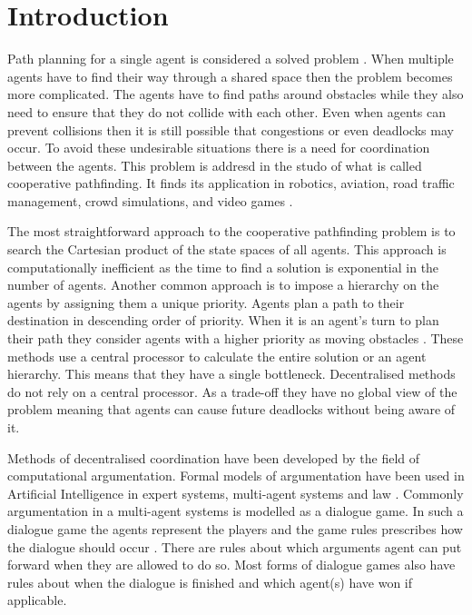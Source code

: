 \section{Introduction}\label{sec:intro}
Path planning for a single agent is considered a solved problem
\citep{sharon2013}. When multiple agents have to find their way through a
shared
space then the problem becomes more complicated. The agents have to find paths
around obstacles while they also need to ensure that they do not collide with
each other. Even when agents can prevent collisions then it is still possible
that congestions or even deadlocks may occur. To avoid these undesirable
situations there is a need for coordination between the agents. This problem is
addresd in the studo of what is called cooperative pathfinding. It finds its
application in robotics, aviation, road traffic management, crowd simulations,
and video games \citep{standley2011}.

The most straightforward approach to the cooperative pathfinding problem
is to search the Cartesian product of the state spaces of all agents. This
approach is computationally inefficient \citep{sharon2013,hopcroft1984} as the
time to find a solution is exponential in the number of agents. Another common
approach is to impose a hierarchy on the agents by assigning them a unique
priority. Agents plan a path to their destination in descending order of
priority. When it is an agent's turn to plan their path they consider agents
with a higher priority as moving obstacles \citep{bennewitz2002}. These methods
use a central processor to calculate the entire solution or an agent hierarchy.
This means that they have a single bottleneck. Decentralised methods do not
rely on a central processor. As a trade-off they have no global view of the
problem meaning that agents can cause future deadlocks without being aware of
it.

Methods of decentralised coordination have been developed by the field of
computational argumentation. Formal models of argumentation have been used in
Artificial Intelligence in expert systems, multi-agent systems and law
\citep{vaneemeren2014}. Commonly argumentation in a multi-agent systems is
modelled as a dialogue game. In such a dialogue game the agents represent the
players and the game rules prescribes how the dialogue should occur
\citep{walton1995}. There are rules about which arguments agent can put forward
when they are allowed to do so. Most forms of dialogue games also have rules
about when the dialogue is finished and which agent(s) have won if applicable.

